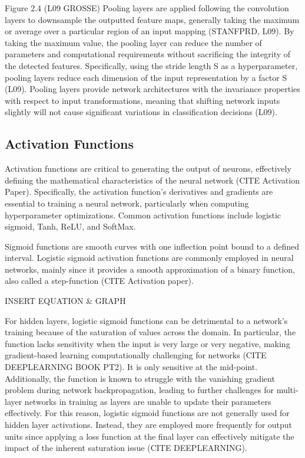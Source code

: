 \documentclass{article}
\begin{document}
Figure 2.4 (L09 GROSSE)
Pooling layers are applied following the convolution layers to downsample the outputted feature maps, generally taking the maximum or average over a particular region of an input mapping (STANFPRD, L09). By taking the maximum value, the pooling layer can reduce the number of parameters and computational requirements without sacrificing the integrity of the detected features. Specifically, using the stride length S as a hyperparameter, pooling layers reduce each dimension of the input representation by a factor S (L09). Pooling layers provide network architectures with the invariance properties with respect to input transformations, meaning that shifting network inputs slightly will not cause significant variations in classification decisions (L09). 

\subsection{Activation Functions}
Activation functions are critical to generating the output of neurons, effectively defining the mathematical characteristics of the neural network (CITE Activation Paper). Specifically, the activation function’s derivatives and gradients are essential to training a neural network, particularly when computing hyperparameter optimizations. Common activation functions include logistic sigmoid, Tanh, ReLU, and SoftMax. 

Sigmoid functions are smooth curves with one inflection point bound to a defined interval. Logistic sigmoid activation functions are commonly employed in neural networks, mainly since it provides a smooth approximation of a binary function, also called a step-function (CITE Activation paper). 

INSERT EQUATION \& GRAPH

For hidden layers, logistic sigmoid functions can be detrimental to a network’s training because of the saturation of values across the domain. In particular, the function lacks sensitivity when the input is very large or very negative, making gradient-based learning computationally challenging for networks (CITE DEEPLEARNING BOOK PT2). It is only sensitive at the mid-point. Additionally, the function is known to struggle with the vanishing gradient problem during network backpropagation, leading to further challenges for multi-layer networks in training as layers are unable to update their parameters effectively. For this reason, logistic sigmoid functions are not generally used for hidden layer activations. Instead, they are employed more frequently for output units since applying a loss function at the final layer can effectively mitigate the impact of the inherent saturation issue (CITE DEEPLEARNING). 
\end{document}
